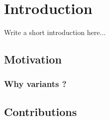 \chapter{Introduction}

Write a short introduction here...


\section{Motivation}

\subsection{Why variants ?}

\section{Contributions}